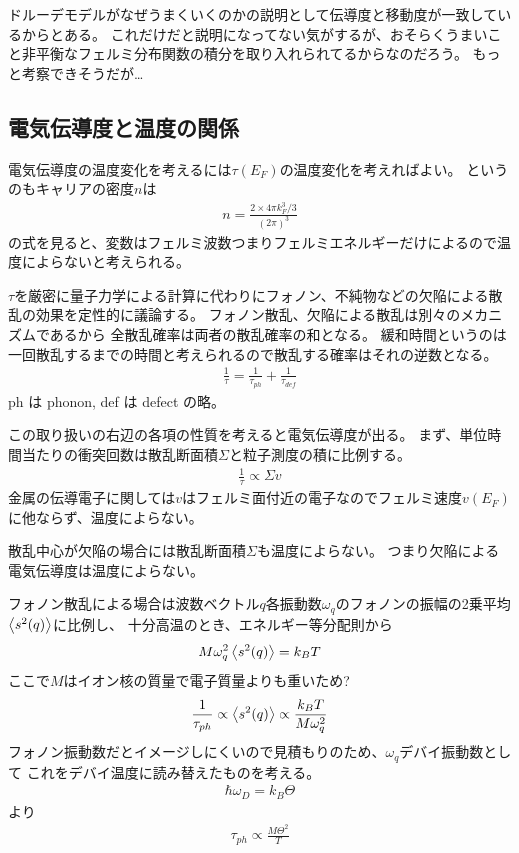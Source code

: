 \documentclass[11pt,dvipdfmx,a4paper]{jsarticle}
\begin{document}
ドルーデモデルがなぜうまくいくのかの説明として伝導度と移動度が一致しているからとある。
これだけだと説明になってない気がするが、おそらくうまいこと非平衡なフェルミ分布関数の積分を取り入れられてるからなのだろう。
もっと考察できそうだが\dots

\subsection{電気伝導度と温度の関係}
電気伝導度の温度変化を考えるには\(\tau(E_F)\)の温度変化を考えればよい。
というのもキャリアの密度\(n\)は
\begin{align}
    n = \frac{2\times 4\pi k_F^3 /3}{(2\pi)^3} %
\end{align}
の式を見ると、変数はフェルミ波数つまりフェルミエネルギーだけによるので温度によらないと考えられる。

\(\tau\)を厳密に量子力学による計算に代わりにフォノン、不純物などの欠陥による散乱の効果を定性的に議論する。
フォノン散乱、欠陥による散乱は別々のメカニズムであるから
全散乱確率は両者の散乱確率の和となる。
緩和時間というのは一回散乱するまでの時間と考えられるので散乱する確率はそれの逆数となる。
\begin{align}
    \frac{1}{\tau} = \frac{1}{\tau_{ph}} +\frac{1}{\tau_{def}} %
\end{align}
ph は phonon, def は defect の略。

この取り扱いの右辺の各項の性質を考えると電気伝導度が出る。
まず、単位時間当たりの衝突回数は散乱断面積\(\Sigma\)と粒子測度の積に比例する。
\begin{align}
    \frac{1}{\tau} \propto \Sigma v
\end{align}
金属の伝導電子に関しては\(v\)はフェルミ面付近の電子なのでフェルミ速度\(v(E_F)\)に他ならず、温度によらない。

散乱中心が欠陥の場合には散乱断面積\(\Sigma\)も温度によらない。
つまり欠陥による電気伝導度は温度によらない。

フォノン散乱による場合は波数ベクトル\(q\)各振動数\(\omega_q\)のフォノンの振幅の2乗平均
\(\ev{s^2(q)}\)に比例し、%
十分高温のとき、エネルギー等分配則から
\begin{align}
    M\omega_q^2\ev{s^2(q)} = k_BT %
\end{align}
ここで\(M\)はイオン核の質量で電子質量よりも重いため?
\begin{align}
    \frac{1}{\tau_{ph}}\propto \ev{s^2(q)}\propto \frac{k_BT}{M\omega_q^2} %
\end{align}
フォノン振動数だとイメージしにくいので見積もりのため、\(\omega_q\)デバイ振動数として
これをデバイ温度に読み替えたものを考える。
\begin{align}
    \hbar \omega_D = k_B \Theta
\end{align}
より
\begin{align}
    \tau_{ph} \propto \frac{M\Theta^2}{T} %
\end{align}
\end{document}
